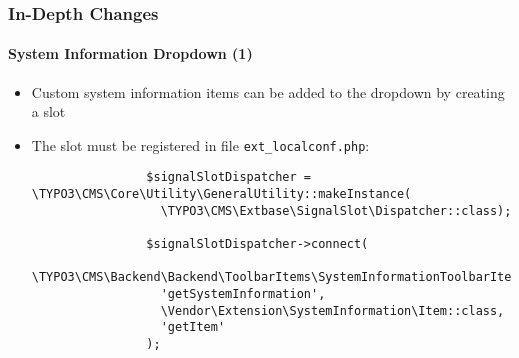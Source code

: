 \begin{frame}[fragile]
	\frametitle{In-Depth Changes}
	\framesubtitle{System Information Dropdown (1)}

	\lstset{basicstyle=\tiny\ttfamily}

	\begin{itemize}
		\item Custom system information items can be added to the dropdown by creating a slot

		\item The slot must be registered in file \texttt{ext\_localconf.php}:

			\begin{lstlisting}
				$signalSlotDispatcher = \TYPO3\CMS\Core\Utility\GeneralUtility::makeInstance(
				  \TYPO3\CMS\Extbase\SignalSlot\Dispatcher::class);

				$signalSlotDispatcher->connect(
				  \TYPO3\CMS\Backend\Backend\ToolbarItems\SystemInformationToolbarItem::class,
				  'getSystemInformation',
				  \Vendor\Extension\SystemInformation\Item::class,
				  'getItem'
				);
			\end{lstlisting}

	\end{itemize}

\end{frame}

